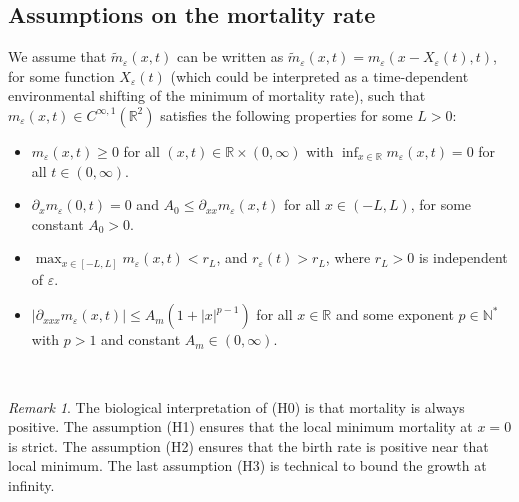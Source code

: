 \documentclass[]{article}
\theoremstyle{remark}
\newtheorem{remark}{Remark}
\begin{document}
\subsection*{Assumptions on the mortality rate}
We assume that $\tilde{m}_{\varepsilon}(x,t)$ can be written as $\tilde{m}_{\varepsilon}(x,t)={m}_{\varepsilon}(x-X_\varepsilon(t),t)$, for some function $X_\varepsilon(t)$ (which could be interpreted as a time-dependent environmental shifting of the minimum of mortality rate),  such that ${m}_\varepsilon(x,t)\in{}C^{\infty,1}(\mathbb{R}^2)$ satisfies the following properties for some $L >0$:
\ \\
\begin{itemize}
\item[(H0)] $m_\varepsilon(x,t)\geq 0$ for all $(x,t)\in \mathbb{R}\times (0,\infty)$ with $\inf_{x\in \mathbb{R}}m_\varepsilon(x,t) = 0$ for all $t\in (0,\infty)$. 
\item[(H1)] $\partial_{x}m_\varepsilon(0,t)  = 0$ and $A_0  \leq \partial_{xx}m_\varepsilon(x,t)$ for all $x\in (-L,L)$,  for some constant $A_{0}>0.$ 
\item[(H2)] $\max_{x \in [-L,L]} m_\varepsilon(x,t) < r_L $, and $r_\varepsilon(t)>r_L$, where $r_L>0$ is independent of $\varepsilon$.
\item[(H3)] $|\partial_{xxx}m_\varepsilon(x,t)| \leq A_m  (1+|x|^{p-1})$ for all $x\in \mathbb{R}$ and some exponent $p \in \mathbb N^*$ with $p>1$ and constant $A_m \in (0,\infty)$. 
\end{itemize}
\ \\
\begin{remark}
The biological interpretation of (H0) is that mortality is always positive. The assumption (H1) ensures that the local minimum mortality at $x=0$ is strict. The assumption (H2) ensures that the birth rate is positive  near that local minimum. The last assumption (H3) is technical to bound the growth at infinity.
\end{remark}
\end{document}
